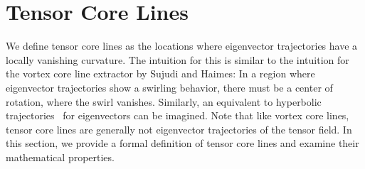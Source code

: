 
%
\section{Tensor Core Lines} %
\label{sec:tcl_theory}
%
We define tensor core lines as the locations where eigenvector trajectories have
a locally vanishing curvature.
%
The intuition for this is similar to the intuition for the vortex core line
extractor by Sujudi and Haimes:
%
In a region where eigenvector trajectories show a swirling behavior, there must
be a center of rotation, where the swirl vanishes.
%
Similarly, an equivalent to hyperbolic trajectories~\cite{Machado2013} for
eigenvectors can be imagined.
%
Note that like vortex core lines, tensor core lines are generally not
eigenvector trajectories of the tensor field.
%
In this section, we provide a formal definition of tensor core lines and
examine their mathematical properties.
%

